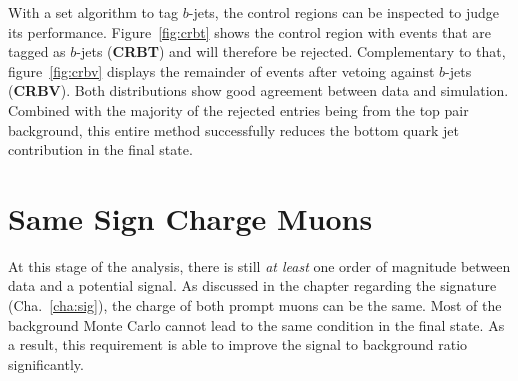 With a set algorithm to tag $b$-jets, the control regions can be inspected to judge its performance. Figure~\ref{fig:crbt} shows the control region with events that are tagged as $b$-jets (\textbf{CRBT}) and will therefore be rejected. Complementary to that, figure~\ref{fig:crbv} displays the remainder of events after vetoing against $b$-jets (\textbf{CRBV}). Both distributions show good agreement between data and simulation. Combined with the majority of the rejected entries being from the top pair background, this entire method successfully reduces the bottom quark jet contribution in the final state.


\section{Same Sign Charge Muons}
\label{sec:sscmuons}

At this stage of the analysis, there is still \textit{at least} one order of magnitude between data and a potential signal. As discussed in the chapter regarding the signature (Cha.~\ref{cha:sig}), the charge of both prompt muons can be the same. Most of the background Monte Carlo cannot lead to the same condition in the final state. As a result, this requirement is able to improve the signal to background ratio significantly.

